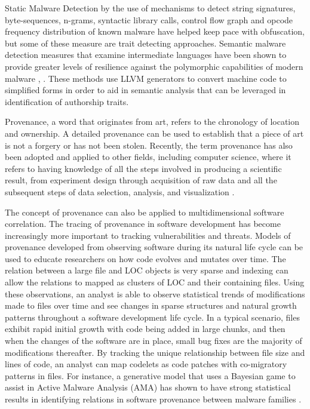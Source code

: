 \documentclass[12pt]{report}
\begin{document}
Static Malware Detection by the use of mechanisms to detect string signatures, byte-sequences, n-grams, syntactic library calls, control flow graph and opcode frequency distribution of known malware have helped keep pace with obfuscation, but some of these measure are trait detecting approaches.  Semantic malware detection measures that examine intermediate languages have been shown to provide greater levels of resilience against the polymorphic capabilities of modern malware \cite{christodorescu2005semantics}, \cite{ranjan2016boolean}.  These methods use LLVM generators to convert machine code to simplified forms in order to aid in semantic analysis that can be leveraged in identification of authorship traits.  

Provenance, a word that originates from art, refers to the chronology of location and ownership.  A detailed provenance can be used to establish that a piece of art is not a forgery or has not been stolen.  Recently, the term provenance has also been adopted and applied to other fields, including computer science, where it refers to having knowledge of all the steps involved in producing a scientific result, from experiment design through acquisition of raw data and all the subsequent steps of data selection, analysis, and visualization \cite{provenance:2011}.

The concept of provenance can also be applied to multidimensional software correlation.  The tracing of provenance in software development has become increasingly more important to tracking vulnerabilities and threats.  Models of provenance developed from observing software during its natural life cycle can be used to educate researchers on how code evolves and mutates over time.  The relation between a large file and LOC objects is very sparse and indexing can allow the relations to mapped as clusters of LOC and their containing files.  Using these observations, an analyst is able to observe statistical trends of modifications made to files over time and see changes in sparse structures and natural growth patterns throughout a software development life cycle.  In a typical scenario, files exhibit rapid initial growth with code being added in large chunks, and then when the changes of the software are in place, small bug fixes are the majority of modifications thereafter.  By tracking the unique relationship between file size and lines of code, an analyst can map codelets as code patches with co-migratory patterns in files.  \cite{provenance2:2014}  For instance, a generative model that uses a Bayesian game to assist in Active Malware Analysis (AMA) has shown to have strong statistical results in identifying relations in software provenance between malware families \cite{sartea2020bayesian}.  
\end{document}
